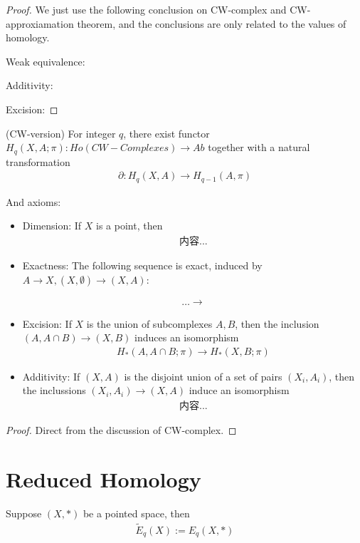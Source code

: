 \documentclass[Total.tex]{subfiles}
\begin{document}
		\begin{proof}
			We just use the following conclusion on CW-complex and CW-approxiamation theorem, and the conclusions are only related to the values of homology.
			
			Weak equivalence:
			
			Additivity:
			
			Excision:
		\end{proof}
		
		\begin{theorem}
			(CW-version) For integer $q$, there exist functor $H_q(X,A;\pi):Ho(CW-Complexes)\rightarrow Ab$ together with a natural transformation
			\begin{gather*}
				\partial:H_q(X,A)\rightarrow H_{q-1}(A,\pi)
			\end{gather*}
			
			And axioms:
			\begin{itemize}
				\item Dimension: If $X$ is a point, then
				\begin{gather*}
					内容...
				\end{gather*}
				\item Exactness: The following sequence is exact, induced by $A\rightarrow X,(X,\emptyset)\rightarrow (X,A)$:
				
				\begin{gather*}
					\dots\rightarrow 
				\end{gather*}
			
				\item Excision: If $X$ is the union of subcomplexes $A,B$, then the inclusion $(A,A\cap B)\rightarrow (X,B)$ induces an isomorphism
				\begin{gather*}
					H_*(A,A\cap B;\pi)\rightarrow H_*(X,B;\pi)
				\end{gather*}
				\item Additivity: If $(X,A)$ is the disjoint union of a set of pairs $(X_i,A_i)$, then the inclussions $(X_i,A_i)\rightarrow (X,A)$ induce an isomorphism
				\begin{gather*}
					内容...
				\end{gather*}
			\end{itemize}
		\end{theorem}
		\begin{proof}
			Direct from the discussion of CW-complex.
		\end{proof}
		\section{Reduced Homology}
			\begin{Def}
				Suppose $(X,*)$ be a pointed space, then
				\begin{gather*}
					\tilde{E}_q(X):=E_q(X,*)
				\end{gather*}
			\end{Def}
			
\end{document}
